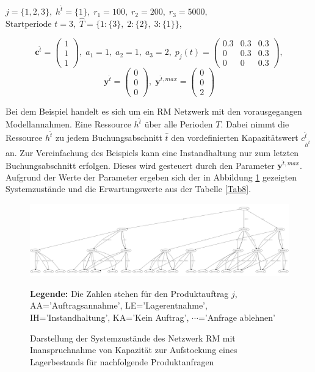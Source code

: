 \begin{center}
$j = \{1, 2, 3\}, \; h^{\hat{t}} = \{1\}, \; r_{1} = 100, \; r_{2} = 200, \; r_{3} = 5000,$ \\
$\text{Startperiode } t=3, \; \hat{T}= \{1: \{3\},\; 2: \{2\},\;3: \{1\} \} $,
\end{center}
\[
    \textbf{c}^{\hat{t}}=\begin{pmatrix} 1\\ 1\\ 1  \end{pmatrix}, \;
    a_{1}=1, \;
     a_{2}=1, \;
       a_{3}=2, \;
            p_{j}(t)=
       \begin{pmatrix}
       0.3 & 0.3 & 0.3 \\
0 & 0.3 & 0.3 \\
0 & 0 & 0.3
\end{pmatrix}, 
  \]
  \[
    \textbf{y}^{\hat{t}}= \begin{pmatrix} 0\\ 0\\ 0  \end{pmatrix}, \;
    \textbf{y}^{\hat{t},max}=\begin{pmatrix} 0\\ 0\\ 2  \end{pmatrix}
      \]

Bei dem Beispiel handelt es sich um ein RM Netzwerk mit den vorausgegangen Modellannahmen. Eine Ressource $h^{\hat{t}}$ über alle Perioden $T$. Dabei nimmt die Ressource $h^{\hat{t}}$ zu jedem Buchungsabschnitt $\hat{t}$ den vordefinierten Kapazitätswert $c^{\hat{t}}_{h^{\hat{t}}}$ an. Zur Vereinfachung des Beispiels kann eine Instandhaltung nur zum letzten Buchungsabschnitt erfolgen. Dieses wird gesteuert durch den Parameter $\textbf{y}^{\hat{t},max}$. Aufgrund der Werte der Parameter ergeben sich der in Abbildung \ref{B8} gezeigten Systemzustände und die Erwartungswerte aus der Tabelle \ref{Tab8}.

\begin{figure}[h!]
  \begin{center}
    \includegraphics[width=200mm, angle=90]{Bilder/Beispiel8.pdf}
    \caption{Darstellung der Systemzustände des Netzwerk RM mit Inanspruchnahme von Kapazität zur Aufstockung eines Lagerbestands für nachfolgende Produktanfragen}  \label{B8}
    {\footnotesize \textbf{Legende:} Die Zahlen stehen für den Produktauftrag $j$, AA='Auftragsannahme', LE='Lagerentnahme', IH='Instandhaltung', KA='Kein Auftrag', $\cdots$='Anfrage ablehnen'} 
  \end{center}
\end{figure}

